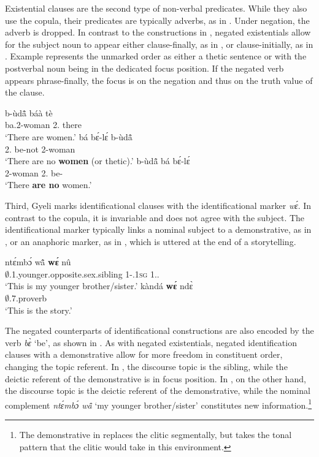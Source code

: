\documentclass[output=paper,colorlinks=true, citecolor=brown,draftmode]{langscibook}
\begin{document}
Existential clauses are the second type of non-verbal predicates. While they also use the {\STAMP} copula, their predicates are typically adverbs, as in . Under negation, the adverb is dropped. In contrast to the constructions in , negated existentials allow for the subject noun to appear either clause-finally, as in , or clause-initially, as in . Example  represents the unmarked order as either a thetic sentence or with the postverbal noun being in the dedicated focus position. If the negated verb appears phrase-finally, the focus is on the negation and thus on the truth value of the clause. 

\ea\label{EX}
\ea\label{EXa} 
  \gll    b-ùdã̂ báà tè\\
          ba.2-woman 2.{\COP} there \\
    \trans `There are women.'
\ex\label{EXb} 
  \gll    bá bɛ́-lɛ́ b-ùdã̂ \\
          2.{\PRS} be-not 2-woman \\
    \trans `There are no \textbf{women} (or thetic).'
\ex\label{EXc} 
  \gll    b-ùdã̂ bá bɛ́-lɛ́\\
          2-woman 2.{\PRS} be-{\NEG} \\
    \trans `There \textbf{are no} women.'
\z
\z

Third, Gyeli marks identificational clauses with the identificational marker {\itshape wɛ́}. In contrast to the {\STAMP} copula, it is invariable and does not agree with the subject. The identificational marker typically links a nominal subject to a demonstrative, as in , or an anaphoric marker, as in , which is uttered at the end of a storytelling. 

\ea\label{we1}
\ea\label{we1a}
  \gll ntɛ́mbɔ́ wã̂ {\bfseries wɛ́} nû \\
    $\emptyset$.1.younger.opposite.sex.sibling 1-{\POSS}.1\textsc{sg} {\ID} 1.{\DEM}.{\PROX}  \\
    \trans `This is my younger brother/sister.'
\ex\label{we1b}
  \gll kàndá {\bfseries wɛ́} ndɛ̀ \\
        $\emptyset$.7.proverb {\ID} {\ANA}  \\
    \trans `This is the story.'  
\z
\z

The negated counterparts of identificational constructions are also encoded by the verb {\itshape bɛ̀} `be', as shown in . As with negated existentials, negated identification clauses with a demonstrative allow for more freedom in constituent order, changing the topic referent. In , the discourse topic is the sibling, while the deictic referent of the demonstrative is in focus position. In , on the other hand, the discourse topic is the deictic referent of the demonstrative, while the nominal complement {\itshape ntɛ́mbɔ́ wã̂} `my younger brother/sister' constitutes new information.\footnote{The demonstrative in  replaces the {\STAMP} clitic segmentally, but takes the tonal pattern that the {\STAMP} clitic would take in this environment.}
\end{document}
